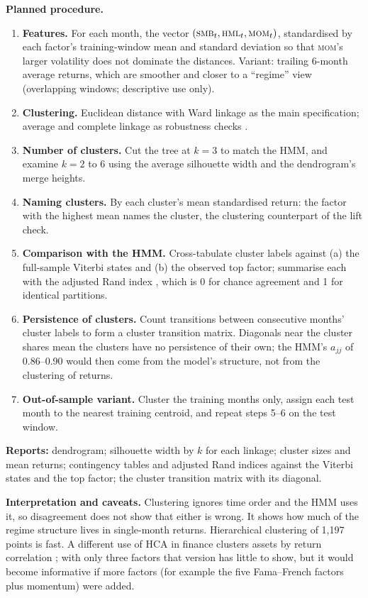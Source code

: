 \documentclass[11pt]{article}
\newcommand{\SMB}{\textsc{smb}}
\newcommand{\HML}{\textsc{hml}}
\newcommand{\MOM}{\textsc{mom}}
\begin{document}
\textbf{Planned procedure.}
\begin{enumerate}
\item \textbf{Features.} For each month, the vector $(\SMB_t,\HML_t,\MOM_t)$, standardised by each factor's training-window mean and standard deviation so that \MOM's larger volatility does not dominate the distances. Variant: trailing 6-month average returns, which are smoother and closer to a ``regime'' view (overlapping windows; descriptive use only).
\item \textbf{Clustering.} Euclidean distance with Ward linkage \citep{ward1963} as the main specification; average and complete linkage as robustness checks \citep{murtagh2012}.
\item \textbf{Number of clusters.} Cut the tree at $k=3$ to match the HMM, and examine $k=2$ to $6$ using the average silhouette width \citep{rousseeuw1987} and the dendrogram's merge heights.
\item \textbf{Naming clusters.} By each cluster's mean standardised return: the factor with the highest mean names the cluster, the clustering counterpart of the lift check.
\item \textbf{Comparison with the HMM.} Cross-tabulate cluster labels against (a) the full-sample Viterbi states and (b) the observed top factor; summarise each with the adjusted Rand index \citep{hubert1985}, which is 0 for chance agreement and 1 for identical partitions.
\item \textbf{Persistence of clusters.} Count transitions between consecutive months' cluster labels to form a cluster transition matrix. Diagonals near the cluster shares mean the clusters have no persistence of their own; the HMM's $a_{jj}$ of 0.86--0.90 would then come from the model's structure, not from the clustering of returns.
\item \textbf{Out-of-sample variant.} Cluster the training months only, assign each test month to the nearest training centroid, and repeat steps 5--6 on the test window.
\end{enumerate}
\textbf{Reports:} dendrogram; silhouette width by $k$ for each linkage; cluster sizes and mean returns; contingency tables and adjusted Rand indices against the Viterbi states and the top factor; the cluster transition matrix with its diagonal.

\textbf{Interpretation and caveats.} Clustering ignores time order and the HMM uses it, so disagreement does not show that either is wrong. It shows how much of the regime structure lives in single-month returns. Hierarchical clustering of 1{,}197 points is fast. A different use of HCA in finance clusters assets by return correlation \citep{mantegna1999}; with only three factors that version has little to show, but it would become informative if more factors (for example the five Fama--French factors plus momentum) were added.
\end{document}
